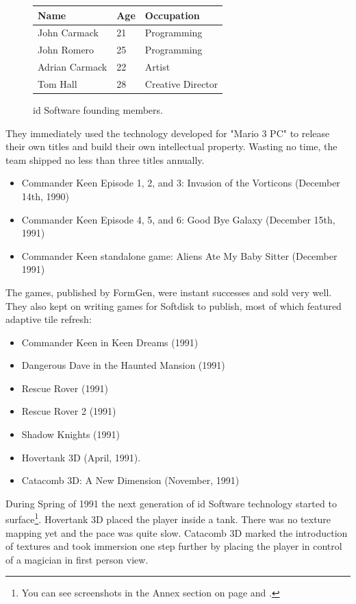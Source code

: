 \documentclass[book.tex]{subfiles}
\begin{document}
 \begin{figure}[H]
\centering  
\begin{tabularx}{\textwidth}{ X  X  X  }
  \toprule
  \textbf{Name} &  \textbf{Age} & \textbf{Occupation} \\
  \toprule 
   John Carmack & 21 &  Programming\\
   John Romero & 25 &  Programming\\
   Adrian Carmack & 22 &  Artist\\
   Tom Hall & 28 &  Creative Director\\
     \toprule
\end{tabularx}
\caption{id Software founding members.}\label{fig:Id Software team}
\end{figure}
\pagebreak
They immediately used the technology developed for "Mario 3 PC" to release their own titles and build their own intellectual property. Wasting no time, the team shipped no less than three titles annually.
\begin{itemize}
    \item Commander Keen Episode 1, 2, and 3: Invasion of the Vorticons (December 14th, 1990)
    \item Commander Keen Episode 4, 5, and 6: Good Bye Galaxy (December 15th, 1991)
    \item Commander Keen standalone game: Aliens Ate My Baby Sitter (December 1991)
\end{itemize}
The games, published by FormGen, were instant successes and sold very well. They also kept on writing games for Softdisk to publish, most of which featured adaptive tile refresh:
\begin{itemize}
  \item Commander Keen in Keen Dreams (1991)
  \item Dangerous Dave in the Haunted Mansion (1991)
  \item Rescue Rover (1991)
  \item Rescue Rover 2 (1991)
  \item Shadow Knights (1991)
  \item Hovertank 3D (April, 1991).
  \item Catacomb 3D: A New Dimension (November, 1991)
\end{itemize}
During Spring of 1991 the next generation of id Software technology started to surface\footnote{You can see screenshots in the Annex section on page \pageref{hovertank3d_screenshot} and \pageref{catacomb3d_screenshot}.}. Hovertank 3D placed the player inside a tank. There was no texture mapping yet and the pace was quite slow. Catacomb 3D marked the introduction of textures and took immersion one step further by placing the player in control of a magician in first person view. \\
\par
\end{document}
